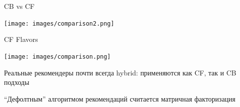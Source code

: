 \documentclass[11pt,aspectratio=169,handout]{beamer}
\begin{document}
\begin{frame}{CB vs CF}

\begin{center}
\texttt{[image: images/comparison2.png]}
\end{center}

\end{frame}

\begin{frame}{CF Flavors}

\begin{center}
\texttt{[image: images/comparison.png]}
\end{center}

\end{frame}

\begin{frame}

\begin{tcolorbox}[colback=info!5,colframe=info!80,title=]
Реальные рекомендеры почти всегда hybrid: применяются как CF, так и CB подходы
\end{tcolorbox}

\begin{tcolorbox}[colback=info!5,colframe=info!80,title=]
``Дефолтным'' алгоритмом рекомендаций считается матричная факторизация
\end{tcolorbox}

\end{frame}
\end{document}

